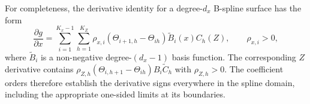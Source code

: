 For completeness, the derivative identity for a degree-$d_x$ B-spline surface
has the form
\begin{equation}
 \frac{\partial g}{\partial x}=
 \sum_{i=1}^{K_x-1}\sum_{h=1}^{K_Z}
 \rho_{x,i}(\Theta_{i+1,h}-\Theta_{ih})
 \widetilde B_i(x)C_h(Z),\qquad \rho_{x,i}>0,
\end{equation}
where $\widetilde B_i$ is a non-negative degree-$(d_x-1)$ basis function.
The corresponding $Z$ derivative contains
$\rho_{Z,h}(\Theta_{i,h+1}-\Theta_{ih})B_i\widetilde C_h$ with
$\rho_{Z,h}>0$.  The coefficient orders therefore establish the derivative
signs everywhere in the spline domain, including the appropriate one-sided
limits at its boundaries.
